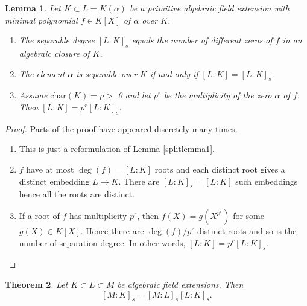 \documentclass[12pt]{report}
\newtheorem{thm}{Theorem}[section]
\newtheorem{lemma}[thm]{Lemma}
\theoremstyle{definition}
\def\aa{\alpha}
\def\char{\text{char}}
\begin{document}
\begin{lemma}\label{seplem1}
    Let $K \subset L = K(\aa)$ be a primitive algebraic field extension with minimal polynomial $f \in K[X]$ of $\aa$ over $K$.
    \begin{enumerate}
        \item The separable degree $[L : K]_s$ equals the number of different zeros of $f$ in an algebraic closure of $K$.
        \item The element $\aa$ is separable over $K$ if and only if $[L : K] = [L : K]_s$.
        \item Assume $\char(K) = p >$ 0 and let $p^r$ be the multiplicity of the zero $\aa$ of $f$. Then $[L:K] =  p^r [L:K]_s$.
    \end{enumerate}
\end{lemma}

\begin{proof}
    Parts of the proof have appeared discretely many times.
    \begin{enumerate}
        \item This is just a reformulation of Lemma \ref{splitlemma1}.
        \item $f$ have at most $\deg(f)=[L:K]$ roots and each distinct root gives a distinct embedding $L\to \overline{K}$. There are $[L : K]_s=[L : K]$ such embeddings hence all the roots are distinct.
        \item If a root of $f$ has multiplicity $p^r$, then $f(X)=g(X^{p^r})$ for some $g(X)\in K[X]$. Hence there are $\deg(f)/p^r$ distinct roots and so is the number of separation degree. In other words, $[L:K] =  p^r [L:K]_s$.
    \end{enumerate}
\end{proof}

\begin{thm}\label{sepdeg}
    Let $K \subset L \subset M$ be algebraic field extensions. Then
    $$[M : K]_s = [M : L]_s [L : K]_s.$$
\end{thm}
\end{document}
